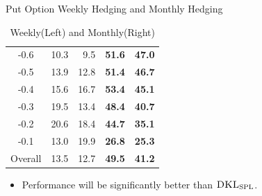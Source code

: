 \documentclass[10pt,table,mathserif]{beamer}
\newcommand{\DKLs}{\bf\textsc{DKL}_{\text{SPL}}}
\begin{document}
\begin{frame}[fragile]{Put Option Weekly Hedging and Monthly Hedging}
\begin{table}[htp!]
{\begin{tabular}{|c|r r r r|}
-0.6      &10.3   &9.5  &\textbf{51.6} &\textbf{47.0}  \\
-0.5      &13.9   &12.8 &\textbf{51.4} &\textbf{46.7} \\
-0.4      &15.6   &16.7 &\textbf{53.4} &\textbf{45.1}  \\
-0.3      &19.5   &13.4 &\textbf{48.4} &\textbf{40.7}  \\
-0.2      &20.6   &18.4 &\textbf{44.7} &\textbf{35.1}  \\
-0.1      &13.0   &19.9 &\textbf{26.8} &\textbf{25.3}  \\
Overall   &13.5   &12.7 &\textbf{49.5} &\textbf{41.2}  \\
			\hline
		\end{tabular}
}\caption{Weekly(Left) and Monthly(Right)}
\end{table}
\begin{itemize}
  \item Performance will be significantly better than $\DKLs$.
\end{itemize}
\end{frame}
\end{document}

